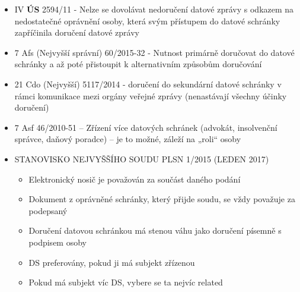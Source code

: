 \begin{itemize}
\begin{itemize}
        \item IV \textbf{ÚS} 2594/11 - Nelze se dovolávat nedoručení datové zprávy s odkazem na nedostatečné oprávnění osoby, která svým přístupem do datové schránky zapříčinila doručení datové zprávy
        \item 7 Afs (Nejvyšší správní) 60/2015-32 - Nutnost primárně doručovat do datové schránky a až poté přistoupit k alternativním způsobům doručování
        \item 21 Cdo (Nejvyšší) 5117/2014 - doručení do sekundární datové schránky v rámci komunikace mezi orgány veřejné zprávy (nenastávají všechny účinky doručení)
        \item 7 Asf 46/2010-51 – Zřízení více datových schránek (advokát, insolvenční správce, daňový poradce) – je to možné, záleží na „roli“ osoby
        \item STANOVISKO NEJVYŠŠÍHO SOUDU PLSN 1/2015 (LEDEN 2017)
        \begin{itemize}
            \item Elektronický nosič je považován za součást daného podání
            \item Dokument z oprávněné schránky, který přijde soudu, se vždy považuje za podepsaný
            \item Doručení datovou schránkou má stenou váhu jako doručení písemně s podpisem osoby
            \item DS preferovány, pokud ji má subjekt zřízenou
            \item Pokud má subjekt víc DS, vybere se ta nejvíc related
        \end{itemize}
    \end{itemize}
\end{itemize}
